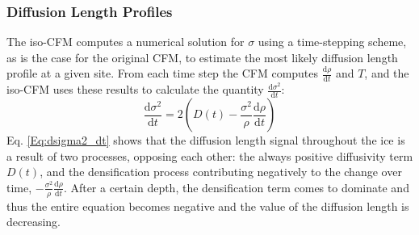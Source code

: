\documentclass[../../CompleteThesis/Complete_1stDraft.tex]{subfiles}
\begin{document}
\subsubsection[Diffusion Length Profiles]{Diffusion Length Profiles}
\label{Sec:IsoCFM_DiffLenProfile}
The iso-CFM computes a numerical solution for $\sigma$ using a time-stepping scheme, as is the case for the original CFM, to estimate the most likely diffusion length profile at a given site. From each time step the CFM computes $\frac{\text{d}\rho}{\text{d}t}$ and $T$, and the iso-CFM uses these results to calculate the quantity $\frac{\text{d}\sigma^2}{\text{d}t}$:
\begin{equation}
	\frac{\text{d}\sigma^2}{\text{d}t} = 2\left(D(t) - \frac{\sigma^2}{\rho}\frac{\text{d}\rho}{\text{d}t}\right)
	\label{Eq:dsigma2_dt}
\end{equation}
Eq. \ref{Eq:dsigma2_dt} shows that the diffusion length signal throughout the ice is a result of two processes, opposing each other: the always positive diffusivity term $D(t)$, and the densification process contributing negatively to the change over time, $-\frac{\sigma^2}{\rho}\frac{\text{d}\rho}{\text{d}t}$.  After a certain depth, the densification term comes to dominate and thus the entire equation becomes negative and the value of the diffusion length is decreasing.
\end{document}

